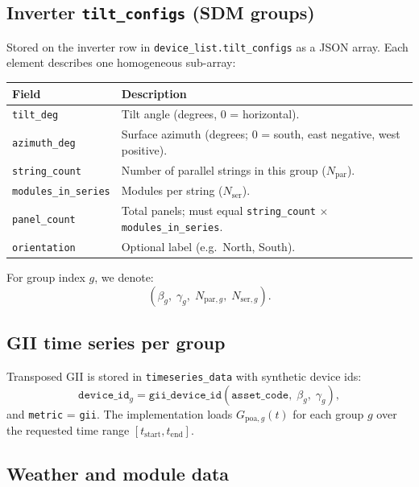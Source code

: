 \documentclass[11pt,a4paper]{article}
\begin{document}
\subsection{Inverter \texttt{tilt\_configs} (SDM groups)}

Stored on the inverter row in \texttt{device\_list.tilt\_configs} as a JSON array. Each element describes one homogeneous sub-array:

\begin{center}
\begin{tabular}{ll}
\toprule
Field & Description \\
\midrule
\texttt{tilt\_deg} & Tilt angle (degrees, 0 = horizontal). \\
\texttt{azimuth\_deg} & Surface azimuth (degrees; 0 = south, east negative, west positive). \\
\texttt{string\_count} & Number of parallel strings in this group (\(N_{\mathrm{par}}\)). \\
\texttt{modules\_in\_series} & Modules per string (\(N_{\mathrm{ser}}\)). \\
\texttt{panel\_count} & Total panels; must equal \texttt{string\_count} \(\times\) \texttt{modules\_in\_series}. \\
\texttt{orientation} & Optional label (e.g.\ North, South). \\
\bottomrule
\end{tabular}
\end{center}

For group index \(g\), we denote:
\begin{equation}
  (\beta_g,\;\gamma_g,\;N_{\mathrm{par},g},\;N_{\mathrm{ser},g}).
\end{equation}

\subsection{GII time series per group}

Transposed GII is stored in \texttt{timeseries\_data} with synthetic device ids:
\begin{equation}
  \mathtt{device\_id}_g = \mathtt{gii\_device\_id}(\mathtt{asset\_code},\; \beta_g,\; \gamma_g),
\end{equation}
and \texttt{metric} = \texttt{gii}. The implementation loads \(G_{\mathrm{poa},g}(t)\) for each group \(g\) over the requested time range \([t_{\mathrm{start}}, t_{\mathrm{end}}]\).

\subsection{Weather and module data}
\end{document}
